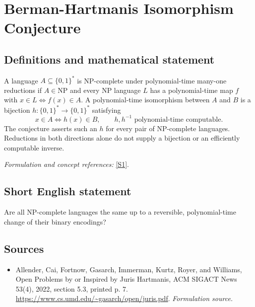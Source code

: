 \documentclass[11pt]{article}
\begin{document}
\section*{\texorpdfstring{Berman-Hartmanis Isomorphism Conjecture}{Berman-Hartmanis Isomorphism Conjecture}}\label{30006769}
\subsection{Definitions and mathematical statement}
A language $A\subseteq\{0,1\}^*$ is NP-complete under polynomial-time many-one reductions if $A\in\mathrm{NP}$ and every NP language $L$ has a polynomial-time map $f$ with $x\in L\iff f(x)\in A$. A polynomial-time isomorphism between $A$ and $B$ is a bijection $h:\{0,1\}^*\to\{0,1\}^*$ satisfying
\[
 x\in A\iff h(x)\in B,
 \qquad h,h^{-1}\text{ polynomial-time computable}.
\]
The conjecture asserts such an $h$ for every pair of NP-complete languages. Reductions in both directions alone do not supply a bijection or an efficiently computable inverse.
\par\smallskip\textit{Formulation and concept references:} \href{https://www.cs.umd.edu/~gasarch/open/juris.pdf}{[S1]}.

\subsection{Short English statement}
Are all NP-complete languages the same up to a reversible, polynomial-time change of their binary encodings?
\subsection{Sources}
\begin{itemize}
\item[S1]Allender, Cai, Fortnow, Gasarch, Immerman, Kurtz, Royer, and Williams, Open Problems by or Inspired by Juris Hartmanis, ACM SIGACT News 53(4), 2022, section 5.3, printed p. 7.
\url{https://www.cs.umd.edu/~gasarch/open/juris.pdf}.
\textit{Formulation source.}
\end{itemize}
\end{document}
